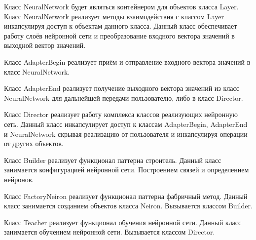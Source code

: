 {\par \redline Класс NeuralNetwork будет являться контейнером для объектов класса Layer. Класс NeuralNetwork реализует методы взаимодействия с классом Layer инкапсулируя доступ к объектам данного класса. Данный класс обеспечивает работу слоёв нейронной сети и преобразование входного вектора значений в выходной вектор значений. 

\par \redline Класс AdapterBegin реализует приём и отправление входного вектора значений в класс NeuralNetwork.  

\par \redline  Класс AdapterEnd реализует получение выходного вектора значений из класс NeuralNetwork для дальнейшей передачи пользователю, либо в класс Director.

\par \redline  Класс Director реализует работу комплекса классов реализующих нейронную сеть. Данный класс инкапсулирует доступ к классам AdapterBegin, AdapterEnd и NeuralNetwork скрывая реализацию от пользователя и инкапсулируя операции от других объектов. 

\par \redline  Класс Builder реализует функционал паттерна строитель. Данный класс занимается конфигурацией нейронной сети. Построением связей и определением нейронов.

\par \redline  Класс FactoryNeiron реализует функционал паттерна фабричный метод. Данный класс занимается созданием объектов класса Neiron. Вызывается классом Builder.

\par \redline  Класс Teacher реализует функционал обучения нейронной сети. Данный класс занимается обучением нейронной сети. Вызывается классом Director.

\par


}

\setcounter{subchaptercntr}{1}
\setcounter{formulacntr}{1}
\setcounter{imagecntr}{1}
\setcounter{tablecntr}{1}

